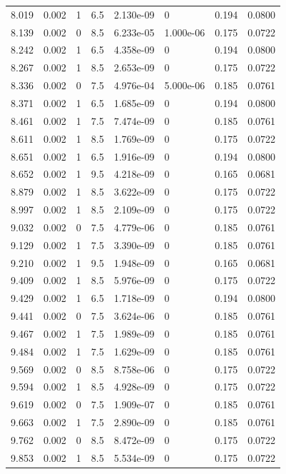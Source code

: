 \documentclass[preview]{standalone}
\begin{document}
{{{\begin{tabular}{L{1.2cm}C{1.2cm} C{0.3cm}C{0.5cm} C{1.4cm}C{1.4cm} C{1.4cm}C{1.4cm}}
  8.019  &  0.002  & 1     & 6.5 &  2.130e-09  & 0  & 0.194 &  0.0800   \\ 
  8.139  &  0.002  & 0     & 8.5 &  6.233e-05  & 1.000e-06  & 0.175 &  0.0722   \\ 
  8.242  &  0.002  & 1     & 6.5 &  4.358e-09  & 0  & 0.194 &  0.0800   \\ 
  8.267  &  0.002  & 1     & 8.5 &  2.653e-09  & 0  & 0.175 &  0.0722   \\ 
  8.336  &  0.002  & 0     & 7.5 &  4.976e-04  & 5.000e-06  & 0.185 &  0.0761   \\ 
  8.371  &  0.002  & 1     & 6.5 &  1.685e-09  & 0  & 0.194 &  0.0800   \\ 
  8.461  &  0.002  & 1     & 7.5 &  7.474e-09  & 0  & 0.185 &  0.0761   \\ 
  8.611  &  0.002  & 1     & 8.5 &  1.769e-09  & 0  & 0.175 &  0.0722   \\ 
  8.651  &  0.002  & 1     & 6.5 &  1.916e-09  & 0  & 0.194 &  0.0800   \\ 
  8.652  &  0.002  & 1     & 9.5 &  4.218e-09  & 0  & 0.165 &  0.0681   \\ 
  8.879  &  0.002  & 1     & 8.5 &  3.622e-09  & 0  & 0.175 &  0.0722   \\ 
  8.997  &  0.002  & 1     & 8.5 &  2.109e-09  & 0  & 0.175 &  0.0722   \\ 
  9.032  &  0.002  & 0     & 7.5 &  4.779e-06  & 0  & 0.185 &  0.0761   \\ 
  9.129  &  0.002  & 1     & 7.5 &  3.390e-09  & 0  & 0.185 &  0.0761   \\ 
  9.210  &  0.002  & 1     & 9.5 &  1.948e-09  & 0  & 0.165 &  0.0681   \\ 
  9.409  &  0.002  & 1     & 8.5 &  5.976e-09  & 0  & 0.175 &  0.0722   \\ 
  9.429  &  0.002  & 1     & 6.5 &  1.718e-09  & 0  & 0.194 &  0.0800   \\ 
  9.441  &  0.002  & 0     & 7.5 &  3.624e-06  & 0  & 0.185 &  0.0761   \\ 
  9.467  &  0.002  & 1     & 7.5 &  1.989e-09  & 0  & 0.185 &  0.0761   \\ 
  9.484  &  0.002  & 1     & 7.5 &  1.629e-09  & 0  & 0.185 &  0.0761   \\ 
  9.569  &  0.002  & 0     & 8.5 &  8.758e-06  & 0  & 0.175 &  0.0722   \\ 
  9.594  &  0.002  & 1     & 8.5 &  4.928e-09  & 0  & 0.175 &  0.0722   \\ 
  9.619  &  0.002  & 0     & 7.5 &  1.909e-07  & 0  & 0.185 &  0.0761   \\ 
  9.663  &  0.002  & 1     & 7.5 &  2.890e-09  & 0  & 0.185 &  0.0761   \\ 
  9.762  &  0.002  & 0     & 8.5 &  8.472e-09  & 0  & 0.175 &  0.0722   \\ 
  9.853  &  0.002  & 1     & 8.5 &  5.534e-09  & 0  & 0.175 &  0.0722   \\ 
\hline 
\end{tabular} 

}}}
\end{document}
